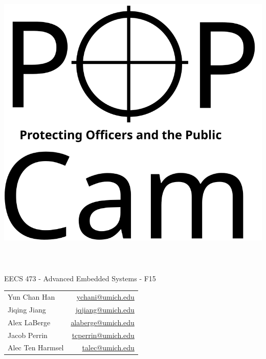 \documentclass[12pt]{article}
\begin{document}
\setcounter{secnumdepth}{1}
\setcounter{tocdepth}{2}

\title{\includegraphics[height=0.3\textheight]{logo}}
\date{}
\maketitle

\vfill

\begin{center}
    {\large EECS 473 - Advanced Embedded Systems - F15}

    \vspace{2.0em}

    \begin{tabular}{lr}
        Yun Chan Han & \url{ychani@umich.edu}\\
        Jiqing Jiang & \url{jqjiang@umich.edu}\\
        Alex LaBerge & \url{alaberge@umich.edu}\\
        Jacob Perrin & \url{tcperrin@umich.edu}\\
        Alec Ten Harmsel & \url{talec@umich.edu}\\
    \end{tabular}
\end{center}

\thispagestyle{empty}
\newpage

\tableofcontents
\thispagestyle{empty}
\newpage
\end{document}
